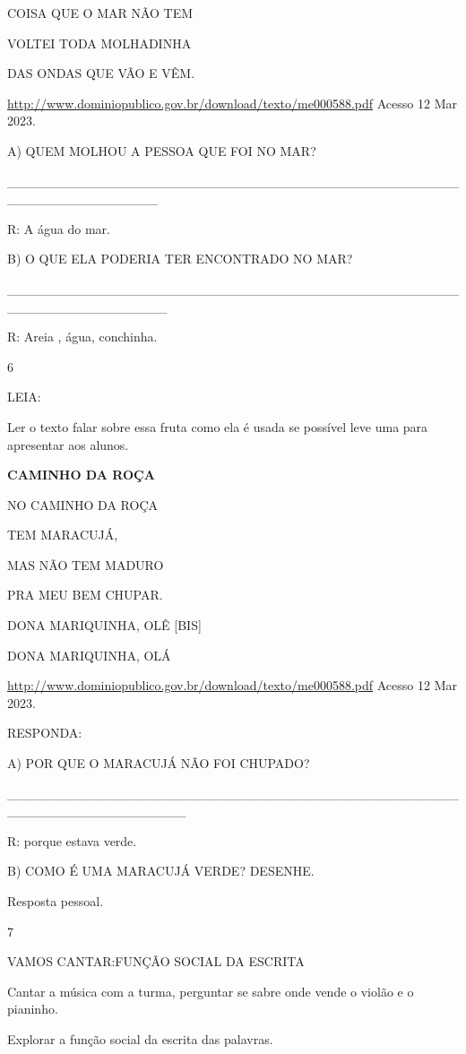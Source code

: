 {{COISA QUE O MAR NÃO TEM

VOLTEI TODA MOLHADINHA

DAS ONDAS QUE VÃO E VÊM.

\url{http://www.dominiopublico.gov.br/download/texto/me000588.pdf}
Acesso 12 Mar 2023.

A) QUEM MOLHOU A PESSOA QUE FOI NO MAR?

\_\_\_\_\_\_\_\_\_\_\_\_\_\_\_\_\_\_\_\_\_\_\_\_\_\_\_\_\_\_\_\_\_\_\_\_\_\_\_\_\_\_\_\_\_\_\_\_\_\_\_\_\_\_\_\_\_\_\_\_\_\_\_\_

R: A água do mar.

B) O QUE ELA PODERIA TER ENCONTRADO NO MAR?

\_\_\_\_\_\_\_\_\_\_\_\_\_\_\_\_\_\_\_\_\_\_\_\_\_\_\_\_\_\_\_\_\_\_\_\_\_\_\_\_\_\_\_\_\_\_\_\_\_\_\_\_\_\_\_\_\_\_\_\_\_\_\_\_\_

R: Areia , água, conchinha.

\num{6}

LEIA:

Ler o texto falar sobre essa fruta como ela é usada se possível leve uma
para apresentar aos alunos.

\textbf{CAMINHO DA ROÇA}

NO CAMINHO DA ROÇA

TEM MARACUJÁ,

MAS NÃO TEM MADURO

PRA MEU BEM CHUPAR.

DONA MARIQUINHA, OLÊ {[}BIS{]}

DONA MARIQUINHA, OLÁ

\url{http://www.dominiopublico.gov.br/download/texto/me000588.pdf}
Acesso 12 Mar 2023.

RESPONDA:

A) POR QUE O MARACUJÁ NÃO FOI CHUPADO?

\_\_\_\_\_\_\_\_\_\_\_\_\_\_\_\_\_\_\_\_\_\_\_\_\_\_\_\_\_\_\_\_\_\_\_\_\_\_\_\_\_\_\_\_\_\_\_\_\_\_\_\_\_\_\_\_\_\_\_\_\_\_\_\_\_\_\_

R: porque estava verde.

B) COMO É UMA MARACUJÁ VERDE? DESENHE.

Resposta pessoal.

\num{7}

VAMOS CANTAR:FUNÇÃO SOCIAL DA ESCRITA

Cantar a música com a turma, perguntar se sabre onde vende o violão e o
pianinho.

Explorar a função social da escrita das palavras.

}}
